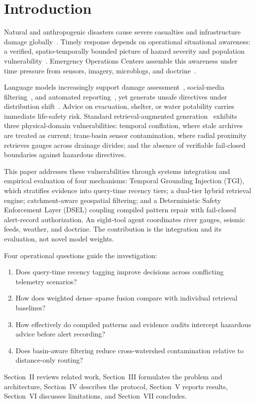 \documentclass[conference]{IEEEtran}
\begin{document}
\section{Introduction}
Natural and anthropogenic disasters cause severe casualties and infrastructure damage globally~\cite{undrr}. Timely response depends on operational situational awareness: a verified, spatio-temporally bounded picture of hazard severity and population vulnerability~\cite{endsley,aboualola2023}. Emergency Operations Centers assemble this awareness under time pressure from sensors, imagery, microblogs, and doctrine~\cite{crisismmd,aboualola2023}.

Language models increasingly support damage assessment~\cite{singh}, social-media filtering~\cite{olteanu2015,dinani}, and automated reporting~\cite{cantini}, yet generate unsafe directives under distribution shift~\cite{ji,yu2024}. Advice on evacuation, shelter, or water potability carries immediate life-safety risk. Standard retrieval-augmented generation~\cite{lewis} exhibits three physical-domain vulnerabilities: temporal conflation, where stale archives are treated as current; trans-basin sensor contamination, where radial proximity retrieves gauges across drainage divides; and the absence of verifiable fail-closed boundaries against hazardous directives.

This paper addresses these vulnerabilities through systems integration and empirical evaluation of four mechanisms: Temporal Grounding Injection (TGI), which stratifies evidence into query-time recency tiers; a dual-tier hybrid retrieval engine; catchment-aware geospatial filtering; and a Deterministic Safety Enforcement Layer (DSEL) coupling compiled pattern repair with fail-closed alert-record authorization. An eight-tool agent coordinates river gauges, seismic feeds, weather, and doctrine. The contribution is the integration and its evaluation, not novel model weights.

Four operational questions guide the investigation:
\begin{enumerate}
\item[1)] Does query-time recency tagging improve decisions across conflicting telemetry scenarios?
\item[2)] How does weighted dense--sparse fusion compare with individual retrieval baselines?
\item[3)] How effectively do compiled patterns and evidence audits intercept hazardous advice before alert recording?
\item[4)] Does basin-aware filtering reduce cross-watershed contamination relative to distance-only routing?
\end{enumerate}
Section~II reviews related work, Section~III formulates the problem and architecture, Section~IV describes the protocol, Section~V reports results, Section~VI discusses limitations, and Section~VII concludes.
\end{document}
